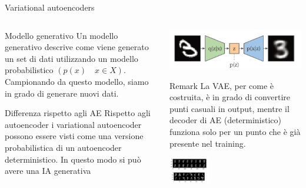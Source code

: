 \documentclass[11pt]{beamer}
\begin{document}
\begin{frame}{Variational autoencoders \cite{pml1Book,pml2Book}}
\begin{columns}
\begin{column}{0.5\textwidth}
\begin{alertblock}{Modello generativo}
Un modello generativo descrive come viene generato un set di dati utilizzando un modello probabilistico $(p(x)\quad x\in X)$. Campionando da questo modello, siamo in grado di generare nuovi dati.
\end{alertblock}
\begin{alertblock}{Differenza rispetto agli AE}
Rispetto agli autoencoder i variational autoencoder possono essere visti come una versione probabilistica di un autoencoder deterministico. In questo modo si può avere una IA generativa
\end{alertblock}
\end{column}
\begin{column}{0.4\textwidth}  
\begin{center}
\includegraphics[width=\textwidth]{Pic/variational_auto_diag.png}
\end{center}
\begin{alertblock}{Remark}
La VAE, per come è costruita, è in grado di convertire punti casuali in output, mentre il decoder di AE (deterministico) funziona solo per un punto che è già presente nel training. 
\end{alertblock}
\begin{center}
\includegraphics[width=0.3\textwidth]{Pic/AE_vs_VAE.png}
\end{center}
\end{column}
\end{columns}
\end{frame}
\end{document}
